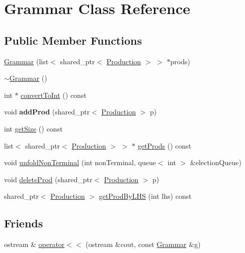 \hypertarget{classGrammar}{\section{Grammar Class Reference}
\label{classGrammar}
}
\subsection*{Public Member Functions}
\begin{DoxyCompactItemize}
\item 
\hyperlink{classGrammar_adc518572feacb51f9859556ba8c08502}{Grammar} (list$<$ shared\-\_\-ptr$<$ \hyperlink{classProduction}{Production} $>$ $>$ $\ast$prods)
\item 
\hyperlink{classGrammar_a60e8bade0190ee9830d9c600e4216b36}{$\sim$\-Grammar} ()
\item 
int $\ast$ \hyperlink{classGrammar_a359e8a4b597224f0c59594d9c8609cee}{convert\-To\-Int} () const 
\item 
\hypertarget{classGrammar_a5fe32ff8e6c0842da64898a45ecc4798}{void {\bfseries add\-Prod} (shared\-\_\-ptr$<$ \hyperlink{classProduction}{Production} $>$ p)}\label{classGrammar_a5fe32ff8e6c0842da64898a45ecc4798}

\item 
int \hyperlink{classGrammar_abb3247e1ddde3fbcbaa66c4ea6595f33}{get\-Size} () const 
\item 
list$<$ shared\-\_\-ptr$<$ \hyperlink{classProduction}{Production} $>$ $>$ $\ast$ \hyperlink{classGrammar_a694a03d8053bb9638acde4fcb82dbd53}{get\-Prods} () const 
\item 
void \hyperlink{classGrammar_a6755b33e54a291cbec28ad7d8af2961a}{unfold\-Non\-Terminal} (int non\-Terminal, queue$<$ int $>$ \&election\-Queue)
\item 
void \hyperlink{classGrammar_a23068f7d1fe5812b8c4bfe5c066e6f7b}{delete\-Prod} (shared\-\_\-ptr$<$ \hyperlink{classProduction}{Production} $>$ p)
\item 
shared\-\_\-ptr$<$ \hyperlink{classProduction}{Production} $>$ \hyperlink{classGrammar_af4e0db12fadf358531a511ca0832f5f1}{get\-Prod\-By\-L\-H\-S} (int lhs) const 
\end{DoxyCompactItemize}
\subsection*{Friends}
\begin{DoxyCompactItemize}
\item 
ostream \& \hyperlink{classGrammar_a54a3c8adc1ef211c3fc4b81e11884337}{operator$<$$<$} (ostream \&cout, const \hyperlink{classGrammar}{Grammar} \&g)
\end{DoxyCompactItemize}


